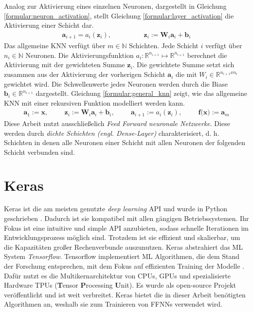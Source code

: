 Analog zur Aktivierung eines einzelnen Neuronen, dargestellt in Gleichung \ref{formular:neuron_activation}, stellt Gleichung \ref{formular:layer_activation} die Aktivierung einer Schicht dar.
\begin{align}
    \label{formular:layer_activation}
    \textbf{a}_{i+1} = a_i(\textbf{z}_i), \hspace{2cm} \textbf{z}_i := \textbf{W}_i\textbf{a}_i + \textbf{b}_i
\end{align}
Das allgemeine KNN verfügt über $m\in\mathbb{N}$ Schichten. Jede Schicht $i$ verfügt über $n_i\in\mathbb{N}$ Neuronen.
Die Aktivierungsfunktion $a_i:\mathbb{R}^{n_{i+1}}\mapsto\mathbb{R}^{n_{i+1}}$ berechnet die Aktivierung mit der gewichteten Summe $\textbf{z}_i$.
Die gewichtete Summe setzt sich zusammen aus der Aktivierung der vorherigen Schicht $\textbf{a}_i$ die mit $W_i\in\mathbb{R}^{n_{i+1}x{n_{i}}}$ gewichtet wird.
Die Schwellenwerte jedes Neuronen werden durch die Biase $\textbf{b}_i\in\mathbb{R}^{n_{i+1}}$ dargestellt.
Gleichung \ref{formular:general_knn} zeigt, wie das allgemeine KNN mit einer rekursiven Funktion modelliert werden kann.
\begin{align}
    \label{formular:general_knn}
    \textbf{a}_1 := \textbf{x}, \hspace{1cm} \textbf{z}_i := \textbf{W}_i\textbf{a}_i + \textbf{b}_i, \hspace{1cm} \textbf{a}_{i+1} := a_i(\textbf{z}_i), \hspace{1cm} \textbf{f(x)} := \textbf{a}_m
\end{align}
Diese Arbeit nutzt ausschließelich \textit{Feed Forward neuronale Netzwerke}.
Diese werden durch \textit{dichte Schichten (engl. Dense-Layer)} charakterisiert, d. h. Schichten in denen alle Neuronen einer Schicht mit allen Neuronen der folgenden Schicht verbunden sind.

\section{Keras}
Keras ist die am meisten genutzte \textit{deep learning} API und wurde in Python geschrieben \cite{kerasDoc}.
Dadurch ist sie kompatibel mit allen gängigen Betriebssystemen.
Ihr Fokus ist eine intuitive und simple API anzubieten, sodass schnelle Iterationen im Entwicklungsprozess möglich sind.
Trotzdem ist sie effizient und skalierbar, um die Kapazitäten großer Rechenverbunde auszunutzen.
\newline
\newline
Keras abstrahiert das ML System \textit{Tensorflow}. Tensorflow implementiert ML Algorithmen, die dem Stand der Forschung entsprechen, mit dem Fokus
auf effizienten Training der Modelle \cite{abadi2016tensorflow}.
Dafür nutzt es die Multikernarchitektur von CPUs, GPUs und spezialisierte Hardware TPUs (\textbf{T}ensor \textbf{P}rocessing \textbf{U}nit).
Es wurde als open-source Projekt veröffentlicht und ist weit verbreitet.
\newline
\newline
Keras bietet die in dieser Arbeit benötigten Algorithmen an, weshalb sie zum Trainieren von FFNNs verwendet wird.

